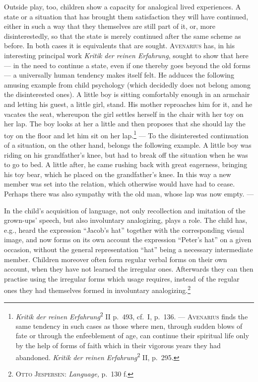 \documentclass[12pt]{book}
\newcommand{\opage}[1]{\marginnote{\footnotesize\textit{[#1]}}}
\begin{document}
Outside play, too, children show a capacity for analogical lived experiences. A
state or a situation that has brought them satisfaction they will have
continued, either in such a way that they themselves are still part of it, or,
more disinterestedly, so that the state is merely continued after the same
scheme as before. In both cases it is equivalents that are sought.
\textsc{Avenarius} has, in his interesting principal work \textit{Kritik der
reinen Erfahrung}, sought to show that here --- in the need to continue a state,
even if one thereby goes beyond the old forms --- a universally human tendency
makes itself felt. He adduces the following amusing example from child
psychology (which decidedly does not belong among the disinterested ones). A
little boy is sitting comfortably enough in an armchair and letting his guest, a
little girl, stand. His mother reproaches him for it, and he vacates the seat,
whereupon the girl settles herself in the chair with her toy on her lap. The boy
looks at her a little and then proposes that she should lay the toy on the floor
and let him sit on her lap.\footnote{\textit{Kritik der reinen
Erfahrung}\textsuperscript{2} II p.\ 493, cf.\ I, p.\ 136. --- \textsc{Avenarius}
finds the same tendency in such cases as those where men, through sudden blows
of fate or through the enfeeblement of age, can continue their spiritual life
only by the help of forms of faith which in their vigorous years they had
abandoned. \textit{Kritik der reinen Erfahrung}\textsuperscript{2} II, p.\ 295.}
--- To the \opage{28}disinterested continuation of a situation, on the other hand, belongs
the following example. A little boy was riding on his grandfather's knee, but
had to break off the situation when he was to go to bed. A little after, he came
rushing back with great eagerness, bringing his toy bear, which he placed on the
grandfather's knee. In this way a new member was set into the relation, which
otherwise would have had to cease. Perhaps there was also sympathy with the old
man, whose lap was now empty. ---

In the child's acquisition of language, not only recollection and imitation of
the grown-ups' speech, but also involuntary analogizing, plays a role. The child
has, e.g., heard the expression ``Jacob's hat'' together with the corresponding
visual image, and now forms on its own account the expression ``Peter's hat'' on
a given occasion, without the general representation ``hat'' being a necessary
intermediate member. Children moreover often form regular verbal forms on their
own account, when they have not learned the irregular ones. Afterwards they can
then practise using the irregular forms which usage requires, instead of the
regular ones they had themselves formed in involuntary
analogizing.\footnote{\textsc{Otto Jespersen:} \textit{Language,} p.\ 130 f.}
\end{document}
